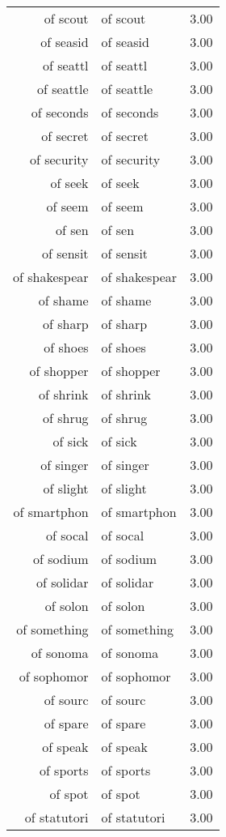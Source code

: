 \begin{table}[ht]
\begin{tabular}{rlr}
  of scout & of scout & 3.00 \\ 
  of seasid & of seasid & 3.00 \\ 
  of seattl & of seattl & 3.00 \\ 
  of seattle & of seattle & 3.00 \\ 
  of seconds & of seconds & 3.00 \\ 
  of secret & of secret & 3.00 \\ 
  of security & of security & 3.00 \\ 
  of seek & of seek & 3.00 \\ 
  of seem & of seem & 3.00 \\ 
  of sen & of sen & 3.00 \\ 
  of sensit & of sensit & 3.00 \\ 
  of shakespear & of shakespear & 3.00 \\ 
  of shame & of shame & 3.00 \\ 
  of sharp & of sharp & 3.00 \\ 
  of shoes & of shoes & 3.00 \\ 
  of shopper & of shopper & 3.00 \\ 
  of shrink & of shrink & 3.00 \\ 
  of shrug & of shrug & 3.00 \\ 
  of sick & of sick & 3.00 \\ 
  of singer & of singer & 3.00 \\ 
  of slight & of slight & 3.00 \\ 
  of smartphon & of smartphon & 3.00 \\ 
  of socal & of socal & 3.00 \\ 
  of sodium & of sodium & 3.00 \\ 
  of solidar & of solidar & 3.00 \\ 
  of solon & of solon & 3.00 \\ 
  of something & of something & 3.00 \\ 
  of sonoma & of sonoma & 3.00 \\ 
  of sophomor & of sophomor & 3.00 \\ 
  of sourc & of sourc & 3.00 \\ 
  of spare & of spare & 3.00 \\ 
  of speak & of speak & 3.00 \\ 
  of sports & of sports & 3.00 \\ 
  of spot & of spot & 3.00 \\ 
  of statutori & of statutori & 3.00 \\ 

\end{tabular}
\end{table}
